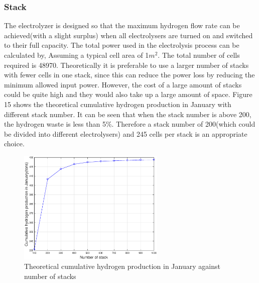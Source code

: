 \subsubsection{Stack}
The electrolyzer is designed so that the maximum hydrogen flow rate can be achieved(with a slight surplus) when all electrolysers are turned on and switched to their full capacity. The total power used in the electrolysis process can be calculated by,
Assuming a typical cell area of 1$m^2$. The total number of cells required is 48970. Theoretically it is preferable to use a larger number of stacks with fewer cells in one stack, since this can reduce the power loss by reducing the minimum allowed input power. However,  the cost of a large amount of stacks could be quite high and they would also take up a large amount of space. Figure 15 shows the theoretical cumulative hydrogen production in January with different stack number. It can be seen that when the stack number is above 200, the hydrogen waste is less than 5\%. Therefore a stack number of 200(which could be divided into different electrolysers) and 245 cells per stack is an appropriate choice.
 \begin{figure}[H] 
 \centering
\includegraphics[width=7cm]{stack.eps}
\caption{Theoretical cumulative hydrogen production in January against number of stacks}
\end{figure}
 

